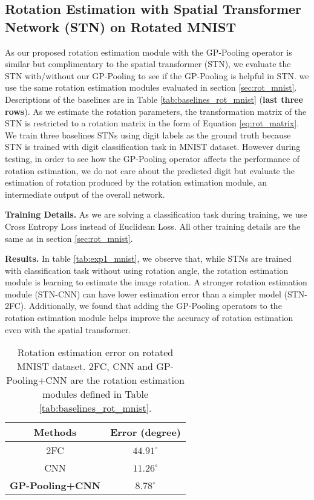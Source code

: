 \documentclass[10pt,twocolumn,letterpaper]{article}
\begin{document}
\subsection{Rotation Estimation with Spatial Transformer Network (STN) on Rotated MNIST} \label{sec:stn_rot_mnist}
As our proposed rotation estimation module with the GP-Pooling operator is similar but complimentary to the spatial transformer (STN), we evaluate the STN with/without our GP-Pooling to see if the GP-Pooling is helpful in STN. we use the same rotation estimation modules evaluated in section \ref{sec:rot_mnist}. Descriptions of the baselines are in Table \ref{tab:baselines_rot_mnist} (\textbf{last three rows}). As we estimate the rotation parameters, the transformation matrix of the STN is restricted to a rotation matrix in the form of Equation \ref{eq:rot_matrix}. We train three baselines STNs using digit labels as the ground truth because STN is trained with digit classification task in MNIST dataset. However during testing, in order to see how the GP-Pooling operator affects the performance of rotation estimation, we do not care about the predicted digit but evaluate the estimation of rotation produced by the rotation estimation module, an intermediate output of the overall network. 

\vspace{1mm}\noindent\textbf{Training Details.} 
As we are solving a classification task during training, we use Cross Entropy Loss instead of Euclidean Loss. All other training details are the same as in section \ref{sec:rot_mnist}. 
 
\vspace{1mm}\noindent\textbf{Results.} In table \ref{tab:exp1_mnist}, we observe 
that, while STNs are trained with classification task without using rotation angle, the rotation estimation module is learning to estimate the image rotation.
A stronger rotation estimation module (STN-CNN) can have lower estimation error than a simpler model (STN-2FC). Additionally, we found that adding the GP-Pooling operators to the rotation estimation module helps improve the accuracy of rotation estimation even with the spatial transformer.

\begin{table}[tb]
\footnotesize
\centering
\begin{tabular}{ |c|c| }
        \hline
        Methods & Error (degree) \\
        \hline
        \hline
        2FC           &       $44.91^{\circ}$               \\
        CNN           &   $11.26^{\circ}$         \\
        \textbf{GP-Pooling+CNN}   &   $\mathbf{8.78^{\circ}}$    \\
        \hline
\end{tabular}

\vspace{0.2cm}
\caption{Rotation estimation error on rotated MNIST dataset. 2FC, CNN and GP-Pooling+CNN are the rotation estimation modules defined in Table \ref{tab:baselines_rot_mnist}.}
\label{tab:exp2_mnist} 
\end{table}
\end{document}
